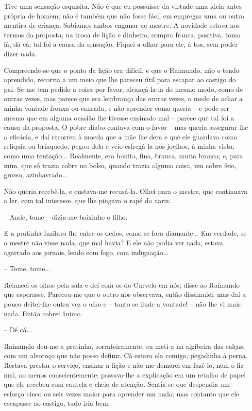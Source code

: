 Tive uma sensação esquisita. Não é que eu possuísse da virtude uma ideia
antes própria de homem; não é também que não fosse fácil em empregar uma
ou outra mentira de criança. Sabíamos ambos enganar ao mestre. A
novidade estava nos termos da proposta, na troca de lição e dinheiro,
compra franca, positiva, toma lá, dá cá; tal foi a causa da sensação.
Fiquei a olhar para ele, à toa, sem poder dizer nada.

Compreende-se que o ponto da lição era difícil, e que o Raimundo, não o
tendo aprendido, recorria a um meio que lhe pareceu útil para escapar ao
castigo do pai. Se me tem pedido a coisa por favor, alcançá-la-ia do
mesmo modo, como de outras vezes, mas parece que era lembrança das
outras vezes, o medo de achar a minha vontade frouxa ou cansada, e não
aprender como queria -- e pode ser mesmo que em alguma ocasião lhe
tivesse ensinado mal -- parece que tal foi a causa da proposta. O pobre
diabo contava com o favor -- mas queria assegurar-lhe a eficácia, e daí
recorreu à moeda que a mãe lhe dera e que ele guardava como relíquia ou
brinquedo; pegou dela e veio esfregá-la nos joelhos, à minha vista, como
uma tentação... Realmente, era bonita, fina, branca, muito branca; e,
para mim, que só trazia cobre no bolso, quando trazia alguma coisa, um
cobre feio, grosso, azinhavrado...

Não queria recebê-la, e custava-me recusá-la. Olhei para o mestre, que
continuava a ler, com tal interesse, que lhe pingava o rapé do nariz.

-- Ande, tome -- dizia-me baixinho o filho.

E a pratinha fuzilava-lhe entre os dedos, como se fora diamante... Em
verdade, se o mestre não visse nada, que mal havia? E ele não podia ver
nada, estava agarrado aos jornais, lendo com fogo, com indignação...

-- Tome, tome...

Relancei os olhos pela sala e dei com os do Curvelo em nós; disse ao
Raimundo que esperasse. Pareceu-me que o outro nos observava, então
dissimulei; mas daí a pouco deitei-lhe outra vez o olho e -- tanto se
ilude a vontade! -- não lhe vi mais nada. Então cobrei ânimo.

-- Dê cá...

Raimundo deu-me a pratinha, sorrateiramente; eu meti-a na algibeira das
calças, com um alvoroço que não posso definir. Cá estava ela comigo,
pegadinha à perna. Restava prestar o serviço, ensinar a lição e não me
demorei em fazê-lo, nem o fiz mal, ao menos conscientemente; passava-lhe
a explicação em um retalho de papel que ele recebeu com cautela e cheio
de atenção. Sentia-se que despendia um esforço cinco ou seis vezes maior
para aprender um nada; mas contanto que ele escapasse ao castigo, tudo
iria bem.


